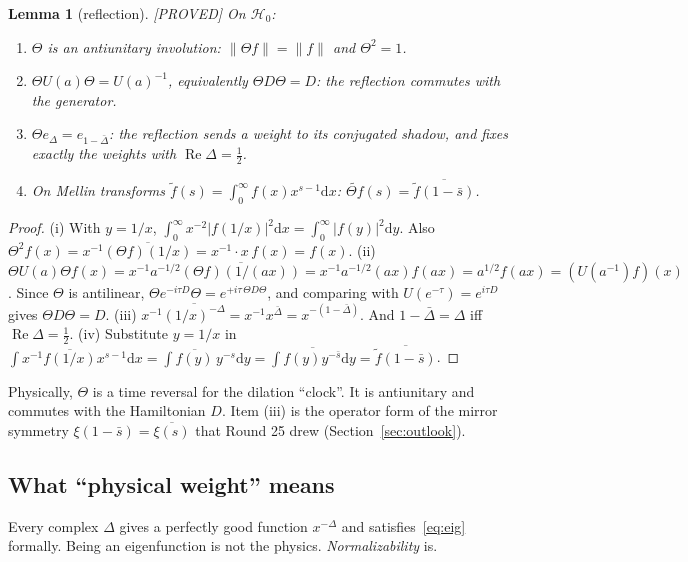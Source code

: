 \documentclass[11pt,a4paper]{article}
\theoremstyle{plain}
\newtheorem{lemma}[theorem]{Lemma}
\theoremstyle{definition}
\theoremstyle{remark}
\newcommand{\cH}{\mathcal{H}}
\newcommand{\dd}{\mathrm{d}}
\newcommand{\lab}[1]{\textsf{\small[#1]}}
\newcommand{\PROVED}{\lab{PROVED}}
\renewcommand{\Re}{\operatorname{Re}}
\begin{document}
\begin{lemma}[reflection]\label{lem:theta}
\PROVED{} On $\cH_0$:
\begin{enumerate}[label=(\roman*)]
\item $\Theta$ is an antiunitary involution: $\|\Theta f\|=\|f\|$ and $\Theta^2=1$.
\item $\Theta U(a)\Theta=U(a)^{-1}$, equivalently $\Theta D\Theta=D$:
the reflection commutes with the generator.
\item $\Theta e_\Delta=e_{1-\bar\Delta}$: the reflection sends a weight to its
conjugated shadow, and fixes exactly the weights with $\Re\Delta=\tfrac12$.
\item On Mellin transforms $\tilde f(s)=\int_0^\infty f(x)x^{s-1}\dd x$:
$\widetilde{\Theta f}(s)=\overline{\tilde f(1-\bar s)}$.
\end{enumerate}
\end{lemma}
\begin{proof}
(i) With $y=1/x$,
$\int_0^\infty x^{-2}|f(1/x)|^2\dd x=\int_0^\infty|f(y)|^2\dd y$. Also
$\Theta^2f(x)=x^{-1}\overline{(\Theta f)(1/x)}=x^{-1}\cdot x\,f(x)=f(x)$.
(ii) $\Theta U(a)\Theta f(x)=x^{-1}a^{-1/2}\overline{(\Theta f)(1/(ax))}
=x^{-1}a^{-1/2}(ax)f(ax)=a^{1/2}f(ax)=(U(a^{-1})f)(x)$. Since $\Theta$ is
antilinear, $\Theta e^{-i\tau D}\Theta=e^{+i\tau\,\Theta D\Theta}$, and
comparing with $U(e^{-\tau})=e^{i\tau D}$ gives $\Theta D\Theta=D$.
(iii) $x^{-1}\overline{(1/x)^{-\Delta}}=x^{-1}x^{\bar\Delta}=x^{-(1-\bar\Delta)}$.
And $1-\bar\Delta=\Delta$ iff $\Re\Delta=\tfrac12$.
(iv) Substitute $y=1/x$ in
$\int x^{-1}\overline{f(1/x)}x^{s-1}\dd x=\int\overline{f(y)}\,y^{-s}\dd y
=\overline{\int f(y)y^{-\bar s}\dd y}=\overline{\tilde f(1-\bar s)}$.
\end{proof}

Physically, $\Theta$ is a time reversal for the dilation ``clock''. It is
antiunitary and commutes with the Hamiltonian $D$. Item (iii) is the
operator form of the mirror symmetry $\xi(1-\bar s)=\overline{\xi(s)}$ that
Round 25 drew (Section~\ref{sec:outlook}).

\subsection{What ``physical weight'' means}

Every complex $\Delta$ gives a perfectly good function $x^{-\Delta}$ and
satisfies~\eqref{eq:eig} formally. Being an eigenfunction is not the
physics. \emph{Normalizability} is.
\end{document}
